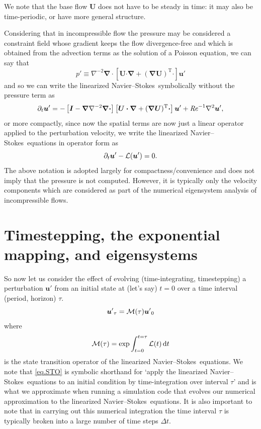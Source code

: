 \documentclass[11pt,a4paper]{report}
\newcommand\Rey{\mbox{\textit{Re}}}
\newcommand\cd{\mathrm{d}}
\newcommand\NavSto{Navier--Stokes}
\newcommand\LNS{linearized \NavSto}
\newcommand\LNSE{\LNS\ equations}
\newcommand\Ubase{{\bm{U}}}
\newcommand\upert{{\bm{u}'}}
\newcommand\ppert{{p}'}
\newcommand\Lop{{\cal L}}
\newcommand\Mop{{\cal M}}
\begin{document}
We note that the base flow $\Ubase$ does not have to be steady in
time: it may also be time-periodic, or have more general structure.

Considering that in incompressible flow the pressure may be considered
a constraint field whose gradient keeps the flow divergence-free and
which is obtained from the advection terms as the solution of a
Poisson equation, we can say that
\begin{equation}
\ppert\equiv
\nabla^{-2}\bm{\nabla\cdot}\left[\Ubase\bm{\cdot\nabla}
+(\bm{\nabla\Ubase})^\text{T}\bm{\cdot}\right]\upert
\end{equation}
and so we can write the \LNS\ symbolically without the pressure term as
\begin{equation}
\partial_t\upert =
-\left[\bm{I}-\bm{\nabla}\nabla^{-2}\bm{\nabla\cdot}\right]
\left[\Ubase\bm{\cdot\nabla}
  +(\bm{\nabla\Ubase})^\text{T}\bm{\cdot}\right]\upert
+ \Rey^{-1}\nabla^2\upert,
\end{equation}
or more compactly, since now the spatial terms are now just a linear
operator applied to the perturbation velocity, we write the
\LNS\ equations in operator form as
\begin{equation}
\partial_t\upert-\Lop(\upert)=0.		
\label{eq.lns}
\end{equation}
The above notation is adopted largely for compactness/convenience and
does not imply that the pressure is not computed.  However, it is
typically only the velocity components which are considered as part of
the numerical eigensystem analysis of incompressible flows.

\section{Timestepping, the exponential mapping, and eigensystems}

So now let us consider the effect of evolving (time-integrating,
timestepping) a perturbation $\upert$ from an initial state at (let's
say) $t=0$ over a time interval (period, horizon) $\tau$.
\begin{equation}
\upert_\tau=\Mop(\tau)\upert_0
\label{eq.STO}
\end{equation}
where 
\begin{equation}
\Mop(\tau) = \exp \int_{t=0}^{t=\tau}\Lop(t)\,\cd t
\end{equation}
is the state transition operator of the \LNSE. We note
that \eqref{eq.STO} is symbolic shorthand for `apply the
\LNS\ equations to an initial condition by time-integration over
interval $\tau$' and is what we approximate when running a simulation
code that evolves our numerical approximation to the \LNSE.  It is
also important to note that in carrying out this numerical integration
the time interval $\tau$ is typically broken into a large number of
time steps $\Delta t$.
%
\end{document}
